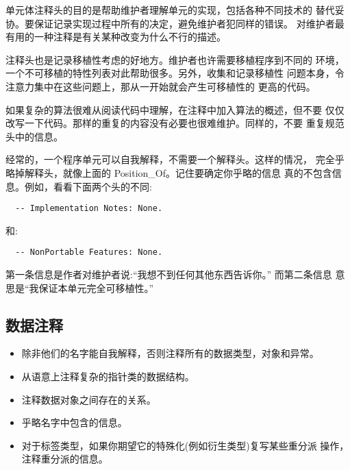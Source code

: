\begin{blockindent}
单元体注释头的目的是帮助维护者理解单元的实现，包括各种不同技术的
替代妥协。要保证记录实现过程中所有的决定，避免维护者犯同样的错误。
对维护者最有用的一种注释是有关某种改变为什么不行的描述。

注释头也是记录移植性考虑的好地方。维护者也许需要移植程序到不同的
环境，一个不可移植的特性列表对此帮助很多。另外，收集和记录移植性
问题本身，令注意力集中在这些问题上，那从一开始就会产生可移植性的
更高的代码。

如果复杂的算法很难从阅读代码中理解，在注释中加入算法的概述，但不要
仅仅改写一下代码。那样的重复的内容没有必要也很难维护。同样的，不要
重复规范头中的信息。
\end{blockindent}

\begin{blockindent}
经常的，一个程序单元可以自我解释，不需要一个解释头。这样的情况，
完全乎略掉解释头，就像上面的 Position\_Of。记住要确定你乎略的信息
真的不包含信息。例如，看看下面两个头的不同:
\begin{lstlisting}
  -- Implementation Notes: None.
\end{lstlisting}
和:
\begin{lstlisting}
  -- NonPortable Features: None.
\end{lstlisting}
第一条信息是作者对维护者说:``我想不到任何其他东西告诉你。'' 而第二条信息
意思是``我保证本单元完全可移植性。''
\end{blockindent}

\subsection{数据注释}
\begin{itemize}
    \item 除非他们的名字能自我解释，否则注释所有的数据类型，对象和异常。
    \item 从语意上注释复杂的指针类的数据结构。
    \item 注释数据对象之间存在的关系。
    \item 乎略名字中包含的信息。
    \item 对于标签类型，如果你期望它的特殊化(例如衍生类型)复写某些重分派
    操作，注释重分派的信息。
\end{itemize}

